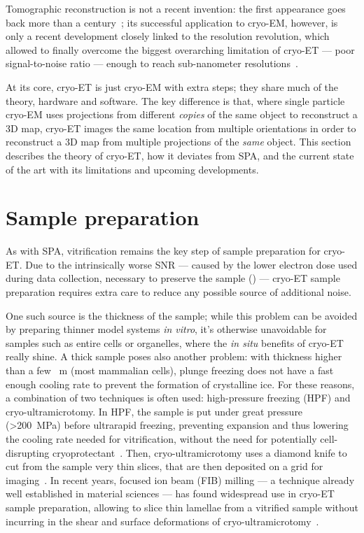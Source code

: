 Tomographic reconstruction is not a recent invention: the first appearance goes back more than a century~\cite{jDeterminationFunctionsTheir1917}; its successful application to cryo-EM, however, is only a recent development closely linked to the resolution revolution, which allowed to finally overcome the biggest overarching limitation of cryo-ET --- poor signal-to-noise ratio --- enough to reach sub-nanometer resolutions~\cite{lucicCryoelectronTomographyChallenge2013,turkPromiseChallengesCryoelectron2020}.

At its core, cryo-ET is just cryo-EM with extra steps; they share much of the theory, hardware and software.
The key difference is that, where single particle cryo-EM uses projections from different \textit{copies} of the same object to reconstruct a 3D map, cryo-ET images the same location from multiple orientations in order to reconstruct a 3D map from multiple projections of the \textit{same} object.
This section describes the theory of cryo-ET, how it deviates from SPA, and the current state of the art with its limitations and upcoming developments.

\localtableofcontents

\section{Sample preparation}
As with SPA, vitrification remains the key step of sample preparation for cryo-ET.
Due to the intrinsically worse SNR --- caused by the lower electron dose used during data collection, necessary to preserve the sample () --- cryo-ET sample preparation requires extra care to reduce any possible source of additional noise.

One such source is the thickness of the sample; while this problem can be avoided by preparing thinner model systems \textit{in vitro}, it's otherwise unavoidable for samples such as entire cells or organelles, where the \textit{in situ} benefits of cryo-ET really shine.
A thick sample poses also another problem: with thickness higher than a few \unit{\mu{}m} (most mammalian cells), plunge freezing does not have a fast enough cooling rate to prevent the formation of crystalline ice.
For these reasons, a combination of two techniques is often used: high-pressure freezing (HPF) and cryo-ultramicrotomy.
In HPF, the sample is put under great pressure (>\qty{200}{MPa}) before ultrarapid freezing, preventing expansion and thus lowering the cooling rate needed for vitrification, without the need for potentially cell-disrupting cryoprotectant~\cite{moorInfluenceHighPressure1980,bergerCryoelectronTomographyFocused2023}.
Then, cryo-ultramicrotomy uses a diamond knife to cut from the sample very thin slices, that are then deposited on a grid for imaging~\cite{peaseElectronMicroscopyUltramicrotomy1981}.
In recent years, focused ion beam (FIB) milling --- a technique already well established in material sciences --- has found widespread use in cryo-ET sample preparation, allowing to slice thin lamellae from a vitrified sample without incurring in the shear and surface deformations of cryo-ultramicrotomy~\cite{markoFocusedionbeamThinningFrozenhydrated2007}.

